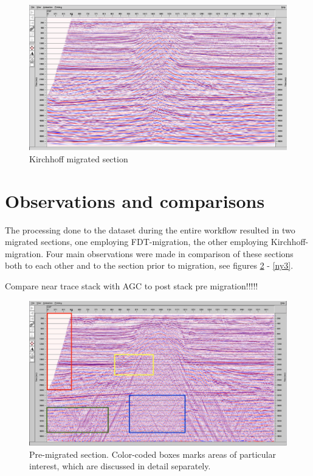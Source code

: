 \documentclass[10pt,a4paper]{article}
\begin{document}
\begin{figure}[H]
\includegraphics[width=\textwidth]{kirchhmed3aforkirchh.jpg}
\caption{Kirchhoff migrated section}
\label{KTM}
\end{figure}

\section{Observations and comparisons}

The processing done to the dataset during the entire workflow resulted in two migrated sections, one employing FDT-migration, the other employing Kirchhoff-migration. Four main observations were made in comparison of these sections both to each other and to the section prior to migration, see figures \ref{ny1} - \ref{ny3}.

Compare near trace stack with AGC to post stack pre migration!!!!!

\begin{figure}[H]
\includegraphics[width=\textwidth]{ny1.jpg}
\caption{Pre-migrated section. Color-coded boxes marks areas of particular interest, which are discussed in detail separately.}
\label{ny1}
\end{figure}
\end{document}

